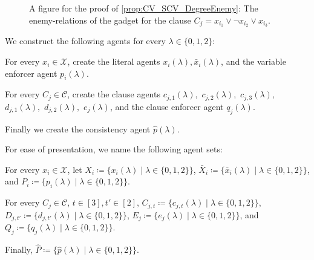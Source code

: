 \documentclass[a4paper,fleqn]{cas-sc}
\newcommand{\ri}{\ensuremath{{\lambda}}}
\newcommand{\tvarN}[1]{\ensuremath{x_{#1}}}
\newcommand{\fvarN}[1]{\ensuremath{\bar{x}_{#1}}}
\newcommand{\cladN}[2]{\ensuremath{c_{#1,#2}}}
\newcommand{\claeN}[2]{\ensuremath{d_{#1,#2}}}\newcommand{\clafN}[1]{\ensuremath{e_{#1}}}
\newcommand{\pickN}[1]{\ensuremath{p_{#1}}}
\newcommand{\qickN}[1]{\ensuremath{q_{#1}}}
\newcommand{\mainpickN}{\ensuremath{\hat{p}}}
\newcommand{\tvar}[2]{\ensuremath{\tvarN{#1}(#2)}}
\newcommand{\fvar}[2]{\ensuremath{\fvarN{#1}(#2)}}
\newcommand{\clad}[3]{\ensuremath{\cladN{#1}{#2}(#3)}}
\newcommand{\clae}[3]{\ensuremath{\claeN{#1}{#2}(#3)}}
\newcommand{\claf}[2]{\ensuremath{\clafN{#1}(#2)}}
\newcommand{\tvars}[1]{\ensuremath{X_{#1}}}
\newcommand{\fvars}[1]{\ensuremath{\bar{X}_{#1}}}
\newcommand{\clads}[2]{\ensuremath{C_{#1,#2}}}
\newcommand{\claes}[2]{\ensuremath{D_{#1,#2}}}
\newcommand{\clafs}[1]{\ensuremath{E_{#1}}}
\newcommand{\picks}[1]{\ensuremath{P_{#1}}}
\newcommand{\qicks}[1]{\ensuremath{Q_{#1}}}
\newcommand{\mainpicks}{\ensuremath{\hat{P}}}
\newcommand{\pick}[2]{\ensuremath{\pickN{#1}(#2)}}
\newcommand{\qick}[2]{\ensuremath{\qickN{#1}(#2)}}
\newcommand{\mainpick}[1]{\ensuremath{\mainpickN(#1)}}
\newcommand{\ii}{\ensuremath{{i}}}
\newcommand{\cia}{\ensuremath{{j}}}
\newcommand{\cib}{\ensuremath{{t}}}
\newcommand{\vars}{\mathcal{X}}
\newcommand{\clas}{\mathcal{C}}
\begin{document}
{\begin{figure}

    \caption{A figure for the proof of \cref{prop:CV_SCV_DegreeEnemy}: The enemy-relations of the gadget for the clause $C_{\cia} = x_{\ii_1} \vee \neg x_{\ii_2} \vee x_{\ii_3}$. }
    \label{fig:CV_SCV_DegreeEnemy}
\end{figure}

We construct the following agents for every $\ri \in \{0,1,2\}$:
\begin{compactitem}
\item For every $x_\ii \in \vars$, create the literal agents $\tvar \ii \ri, \fvar \ii \ri$, and the variable enforcer agent \pick \ii \ri. 
\item For every $C_\cia \in \clas$, create the clause agents $\clad \cia 1 \ri,$ $\clad \cia 2 \ri,$ $\clad \cia 3 \ri,$ $\clae \cia 1 \ri,$ $\clae \cia 2 \ri,$ $\claf \cia \ri$, and the clause enforcer agent \qick \cia \ri.
\item Finally we create the consistency agent \mainpick\ri.
\end{compactitem}

For ease of presentation, we name the following agent sets:
\begin{compactitem}
\item For every $x_\ii \in \vars$, let $\tvars \ii \coloneqq \{\tvar \ii \ri \mid \ri \in \{0,1,2\}\}$, $\fvars \ii \coloneqq \{\fvar \ii \ri \mid \ri \in \{0,1,2\}\}$, and $\picks \ii \coloneqq \{\pick \ii \ri \mid \ri \in \{0,1,2\}\}$.
\item For every $C_\cia \in \clas$, $\cib \in [3], \cib' \in [2]$, $\clads \cia \cib \coloneqq \{\clad \cia \cib \ri \mid \ri \in \{0,1,2\}\}$, $\claes \cia {\cib'} \coloneqq \{\clae \cia {\cib'} \ri \mid \ri \in \{0,1,2\}\}$, $\clafs \cia \coloneqq \{ \claf \cia \ri \mid \ri \in \{0,1,2\}\}$, and $\qicks \cia \coloneqq \{\qick \cia \ri \mid \ri \in \{0,1,2\}\}$.
\item Finally, $\mainpicks \coloneqq \{\mainpick \ri \mid \ri \in \{0,1,2\}\}$.
\end{compactitem}

}
\end{document}
